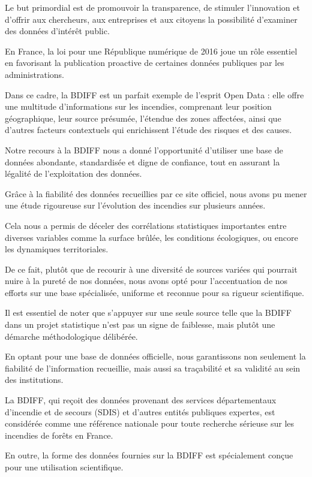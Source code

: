 \documentclass[
]{article}
\begin{document}
Le but primordial est de promouvoir la transparence, de stimuler
l'innovation et d'offrir aux chercheurs, aux entreprises et aux citoyens
la possibilité d'examiner des données d'intérêt public.

En France, la loi pour une République numérique de 2016 joue un rôle
essentiel en favorisant la publication proactive de certaines données
publiques par les administrations.

Dans ce cadre, la BDIFF est un parfait exemple de l'esprit Open Data :
elle offre une multitude d'informations sur les incendies, comprenant
leur position géographique, leur source présumée, l'étendue des zones
affectées, ainsi que d'autres facteurs contextuels qui enrichissent
l'étude des risques et des causes.

Notre recours à la BDIFF nous a donné l'opportunité d'utiliser une base
de données abondante, standardisée et digne de confiance, tout en
assurant la légalité de l'exploitation des données.

Grâce à la fiabilité des données recueillies par ce site officiel, nous
avons pu mener une étude rigoureuse sur l'évolution des incendies sur
plusieurs années.

Cela nous a permis de déceler des corrélations statistiques importantes
entre diverses variables comme la surface brûlée, les conditions
écologiques, ou encore les dynamiques territoriales.

De ce fait, plutôt que de recourir à une diversité de sources variées
qui pourrait nuire à la pureté de nos données, nous avons opté pour
l'accentuation de nos efforts sur une base spécialisée, uniforme et
reconnue pour sa rigueur scientifique.

Il est essentiel de noter que s'appuyer sur une seule source telle que
la BDIFF dans un projet statistique n'est pas un signe de faiblesse,
mais plutôt une démarche méthodologique délibérée.

En optant pour une base de données officielle, nous garantissons non
seulement la fiabilité de l'information recueillie, mais aussi sa
traçabilité et sa validité au sein des institutions.

La BDIFF, qui reçoit des données provenant des services départementaux
d'incendie et de secours (SDIS) et d'autres entités publiques expertes,
est considérée comme une référence nationale pour toute recherche
sérieuse sur les incendies de forêts en France.

En outre, la forme des données fournies sur la BDIFF est spécialement
conçue pour une utilisation scientifique.
\end{document}
